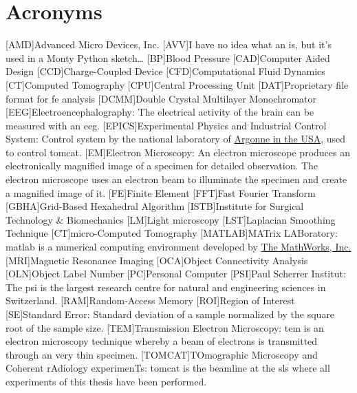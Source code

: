     \chapter*{Acronyms}
	\begin{acronym}[WF-SRXTM]
		[AMD]{Advanced Micro Devices, Inc.}
		[AVV]{I have no idea what an  is, but it's used in a Monty Python sketch\ldots}
		[BP]{Blood Pressure}
		[CAD]{Computer Aided Design}
		[CCD]{Charge-Coupled Device}
		[CFD]{Computational Fluid Dynamics}
		[CT]{Computed Tomography}
		[CPU]{Central Processing Unit}
		[DAT]{Proprietary file format for \acs{fe} analysis}
		{Double Crystal Multilayer Monochromator}
		[EEG]{Electroencephalography}: The electrical activity of the brain can be measured with an \acs{eeg}.
		[EPICS]{Experimental Physics and Industrial Control System}: Control system by the national laboratory of \href{http://www.aps.anl.gov/epics/}{Argonne in the USA}, used to control \acs{tomcat}.
		[EM]{Electron Microscopy}: An electron microscope produces an electronically magnified image of a specimen for detailed observation. The electron microscope uses an electron beam to illuminate the specimen and create a magnified image of it.
		[FE]{Finite Element}
		[FFT]{Fast Fourier Transform}
		{Grid-Based Hexahedral Algorithm}
		{Institute for Surgical Technology \& Biomechanics}
		[LM]{Light microscopy}
		[LST]{Laplacian Smoothing Technique}
		[\micro CT]{micro-Computed Tomography}
		[MATLAB]{MATrix LABoratory}: \acs{matlab} is a numerical computing environment developed by \href{http://www.mathworks.com/}{The MathWorks, Inc.}
		[MRI]{Magnetic Resonance Imaging}
		[OCA]{Object Connectivity Analysis}
		[OLN]{Object Label Number}
		[PC]{Personal Computer}
		[PSI]{Paul Scherrer Institut}: The \acs{psi} is the largest research centre for natural and engineering sciences in Switzerland.
		[RAM]{Random-Access Memory}
		[ROI]{Region of Interest}
		[SE]{Standard Error}: Standard deviation of a sample normalized by the square root of the sample size.
		[TEM]{Transmission Electron Microscopy}: \acs{tem} is an electron microscopy  technique whereby a beam of electrons is transmitted through an very thin specimen.
		[TOMCAT]{TOmographic Microscopy and Coherent rAdiology experimenTs}: \acs{tomcat} is the beamline at the \acs{sls} where all experiments of this thesis have been performed.

\end{acronym}
